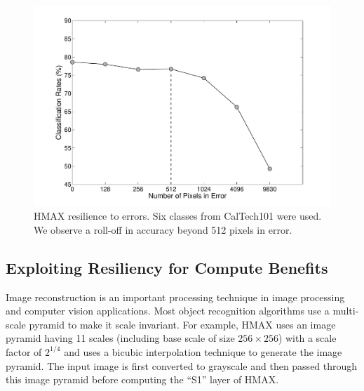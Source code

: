 \begin{figure}[htb!]
\vspace{0pt}
\centering
\includegraphics[width=0.99\linewidth,trim={20 20 30 20}, clip]{./figures/PixelSensitivityAnalysis.pdf}
\vspace{0pt}
\caption{HMAX resilience to errors. Six classes from CalTech101 were used. We observe a roll-off in accuracy beyond 512 pixels in error.}\label{fig:hmax_pixel_sensitivity}
\vspace{0pt}
\end{figure}

\subsection{Exploiting Resiliency for Compute Benefits}
Image reconstruction is an important processing technique in image processing and computer vision applications. Most object recognition algorithms use a multi-scale 
pyramid to make it scale invariant. For example, HMAX uses an image pyramid having 11 scales (including base scale of size $256\times256$) with a 
scale factor of $2^{1/4}$ and uses a bicubic interpolation technique 
to generate the image pyramid. The input image is first converted to grayscale and then passed through this image pyramid before computing the ``S1'' layer of HMAX. 

